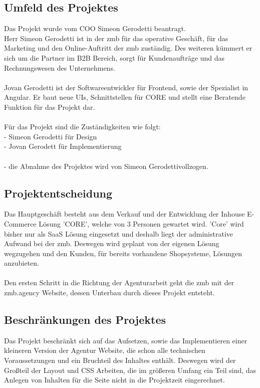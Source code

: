 \documentclass[11pt,a4paper]{article}
\begin{document}
\subsection{Umfeld des Projektes}
Das Projekt wurde vom COO Simeon Gerodetti beantragt.\\
Herr Simeon Gerodetti ist in der zmb für das operative Geschäft, für das Marketing und den Online-Auftritt der zmb zuständig.
Des weiteren kümmert er sich um die Partner im \acs{B2B} Bereich, sorgt für Kundenaufträge und das Rechnungswesen des Unternehmens.\\\\
Jovan Gerodetti ist der Softwareentwickler für Frontend, sowie der Spezialist in Angular. Er baut neue UIs, Schnittstellen für CORE und stellt eine Beratende Funktion für das Projekt dar.\\\\
Für das Projekt sind die Zuständigkeiten wie folgt:\\
- Simeon Gerodetti für Design\\
- Jovan Gerodett für Implementierung\\\\
- die Abnahme des Projektes wird von Simeon Gerodettivollzogen.
\subsection{Projektentscheidung}
Das Hauptgeschäft besteht aus dem Verkauf und der Entwicklung der Inhouse E-Commerce Lösung 'CORE', welche von 3 Personen gewartet wird. 'Core' wird bisher nur als SaaS Lösung eingesetzt und deshalb liegt der administrative Aufwand bei der zmb. Deswegen wird geplant von der eigenen Lösung wegzugehen und den Kunden, für bereits vorhandene Shopsysteme, Lösungen anzubieten.\\\\
Den ersten Schritt in die Richtung der Agenturarbeit geht die zmb mit der zmb.agency Website, dessen Unterbau durch dieses Projekt entsteht.
\subsection{Beschränkungen des Projektes}
Das Projekt beschränkt sich auf das Aufsetzen, sowie das Implementieren einer kleineren Version der Agentur Website, die schon alle technischen Voraussetzungen und ein Bruchteil des Inhaltes enthält. Deswegen wird der Großteil der Layout und CSS Arbeiten, die im größeren Umfang ein Teil sind, das Anlegen von Inhalten für die Seite nicht in die Projektzeit eingerechnet.
\end{document}

